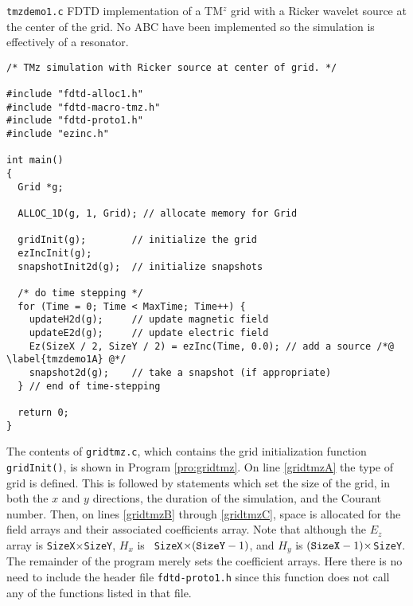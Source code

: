 \begin{program}
{\tt tmzdemo1.c}
FDTD implementation of a TM$^z$ grid with a Ricker wavelet source at
the center of the grid.  No ABC have been implemented so the
simulation is effectively of a resonator.
\label{pro:tmzdemo1}
\codemiddle
\begin{lstlisting}
/* TMz simulation with Ricker source at center of grid. */

#include "fdtd-alloc1.h"
#include "fdtd-macro-tmz.h"
#include "fdtd-proto1.h"
#include "ezinc.h"

int main()
{
  Grid *g;

  ALLOC_1D(g, 1, Grid); // allocate memory for Grid

  gridInit(g);        // initialize the grid
  ezIncInit(g);
  snapshotInit2d(g);  // initialize snapshots

  /* do time stepping */
  for (Time = 0; Time < MaxTime; Time++) {
    updateH2d(g);     // update magnetic field
    updateE2d(g);     // update electric field
    Ez(SizeX / 2, SizeY / 2) = ezInc(Time, 0.0); // add a source /*@ \label{tmzdemo1A} @*/
    snapshot2d(g);    // take a snapshot (if appropriate)
  } // end of time-stepping

  return 0;
}
\end{lstlisting}
\end{program}

The contents of {\tt gridtmz.c}, which contains the grid
initialization function {\tt gridInit()}, is shown in Program
\ref{pro:gridtmz}.  On line \ref{gridtmzA} the type of grid is
defined.  This is followed by statements which set the size of the
grid, in both the $x$ and $y$ directions, the duration of the
simulation, and the Courant number.  Then, on lines \ref{gridtmzB}
through \ref{gridtmzC}, space is allocated for the field arrays and
their associated coefficients array.  Note that although the $E_z$
array is {\tt SizeX}$\times${\tt SizeY}, $H_x$ is {\tt
  SizeX}$\times(\mbox{\tt SizeY}-1)$, and $H_y$ is $(\mbox{\tt
  SizeX}-1)\times${\tt SizeY}.  The remainder of the program merely
sets the coefficient arrays.  Here there is no need to include the
header file {\tt fdtd-proto1.h} since this function does not call any
of the functions listed in that file.

